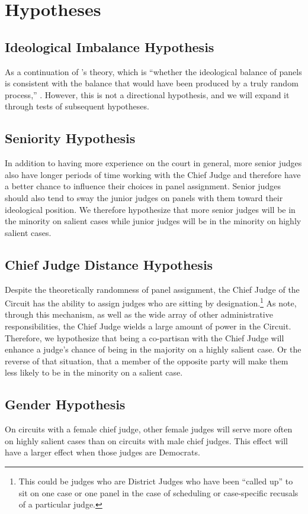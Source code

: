 \documentclass[12pt]{article}
\begin{document}
\section{Hypotheses}\label{Hypotheses}
\subsection*{Ideological Imbalance Hypothesis}
As a continuation of \citeauthor{Chilton2014}'s theory, which is ``whether the ideological balance of panels is consistent with the balance that would have been produced by a truly random process,'' \citep[20]{Chilton2014}.  However, this is not a directional hypothesis, and we will expand it through tests of subsequent hypotheses.

\subsection*{Seniority Hypothesis}
In addition to having more experience on the court in general, more senior judges also have longer periods of time working with the Chief Judge and therefore have a better chance to influence their choices in panel assignment.  Senior judges should also tend to sway the junior judges on panels with them toward their ideological position.  We therefore hypothesize that more senior judges will be in the minority on salient cases while junior judges will be in the minority on highly salient cases.

\subsection*{Chief Judge Distance Hypothesis}
Despite the theoretically randomness of panel assignment, the Chief Judge of the Circuit has the ability to assign judges who are sitting by designation.\footnote{This could be judges who are District Judges who have been ``called up'' to sit on one case or one panel in the case of scheduling or case-specific recusals of a particular judge.}  As \citet{Atkins1974} note, through this mechanism, as well as the wide array of other administrative responsibilities, the Chief Judge wields a large amount of power in the Circuit.  Therefore, we hypothesize that being a co-partisan with the Chief Judge will enhance a judge's chance of being in the majority on a highly salient case.  Or the reverse of that situation, that a member of the opposite party will make them less likely to be in the minority on a salient case.   

\subsection*{Gender Hypothesis}
On circuits with a female chief judge, other female judges will serve more often on highly salient cases than on circuits with male chief judges.  This effect will have a larger effect when those judges are Democrats.
\end{document}
